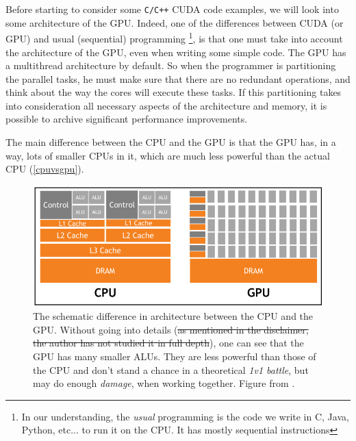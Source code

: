 

Before starting to consider some \verb|C/C++| CUDA code examples, we will look into some architecture of the GPU. 
Indeed, one of the differences between CUDA (or GPU) and usual (sequential) programming \footnote{In our understanding, the
\textit{usual} programming is the code we write in C, Java, Python, etc... to run it on the CPU. It has mostly sequential instructions}, 
is that one must take into account
the architecture of the GPU, even when writing some simple code. The GPU has a multithread architecture by default. 
So when the programmer is partitioning the parallel tasks, he must make sure that there are no redundant
operations, and think about the way the cores will execute these tasks. If this partitioning takes into consideration all necessary aspects of the architecture and memory, it is possible to archive significant performance improvements.


The main difference between the CPU and the GPU is that the GPU has, in a way, lots of smaller CPUs in it, which 
are much less powerful than the actual CPU (\autoref{cpuvsgpu}).
\cite{tuomanen2018hands}

\begin{figure}
   \centering
   \includegraphics[scale=0.4]{pngs/cpuvsgpu.png}
   \caption{The schematic difference in architecture between the CPU and the GPU. Without going into details 
   (\sout{as mentioned in the disclaimer, the author has not studied it in full depth}), one can see that 
   the GPU has many smaller ALUs. They are less powerful than those of the CPU and don't stand a chance in 
    a theoretical \textit{1v1 battle}, but may do enough \textit{damage}, when working together. Figure from \cite{tuomanen2018hands}.}
   \label{cpuvsgpu}
\end{figure}

